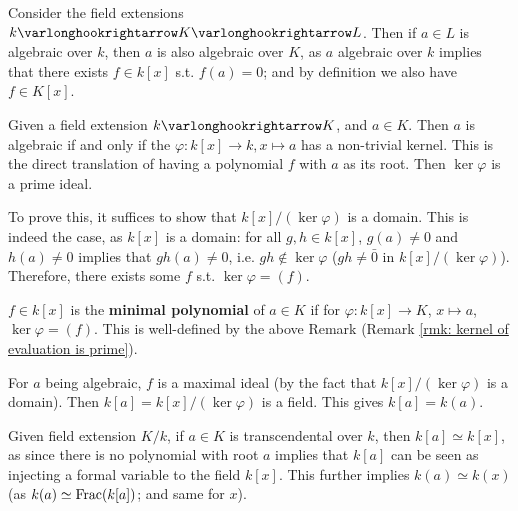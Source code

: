 \begin{remark}
    Consider the field extensions $k \ext K \ext L$. Then if $a \in L$ is algebraic over $k$, then $a$ is also algebraic over $K$, as $a$ algebraic over $k$ implies that there exists $f \in k[x]$ s.t. $f(a) = 0$; and by definition we also have $f \in K[x]$.
\end{remark}

\begin{remark}\label{rmk: kernel of evaluation is prime}
    Given a field extension $k \ext K$, and $a \in K$. Then $a$ is algebraic if and only if the $\varphi: k[x] \to k, x \mapsto a$ has a non-trivial kernel. This is the direct translation of having a polynomial $f$ with $a$ as its root. Then $\ker \varphi$ is a prime ideal.
        
    To prove this, it suffices to show that $k[x]/(\ker \varphi)$ is a domain. This is indeed the case, as $k[x]$ is a domain: for all $g, h \in k[x]$, $g(a) \neq 0$ and $h(a) \neq 0$ implies that $gh(a) \neq 0$, i.e. $gh \notin \ker \varphi$ ($gh \neq \bar{0}$ in $k[x]/(\ker \varphi)$). Therefore, there exists some $f$ s.t. $\ker \varphi = (f)$.
\end{remark}

\begin{definition}
    $f \in k[x]$ is the \textbf{minimal polynomial} of $a \in K$ if for $\varphi: k[x] \to K$, $x \mapsto a$, $\ker \varphi = (f)$. This is well-defined by the above Remark (Remark \ref{rmk: kernel of evaluation is prime}).
\end{definition}

\begin{remark}\label{rmk: algebraic implies k[a] = k(a)}
    For $a$ being algebraic, $f$ is a maximal ideal (by the fact that $k[x]/(\ker \varphi)$ is a domain). Then $k[a] = k[x]/(\ker \varphi)$ is a field. This gives $k[a] = k(a)$.
\end{remark}

\begin{remark}
    Given field extension $K/k$, if $a \in K$ is transcendental over $k$, then $k[a] \simeq k[x]$, as since there is no polynomial with root $a$ implies that $k[a]$ can be seen as injecting a formal variable to the field $k[x]$. This further implies $k(a) \simeq k(x)$ (as $k(a) \simeq \mathrm{Frac}(k[a])$; and same for $x$).
\end{remark}

